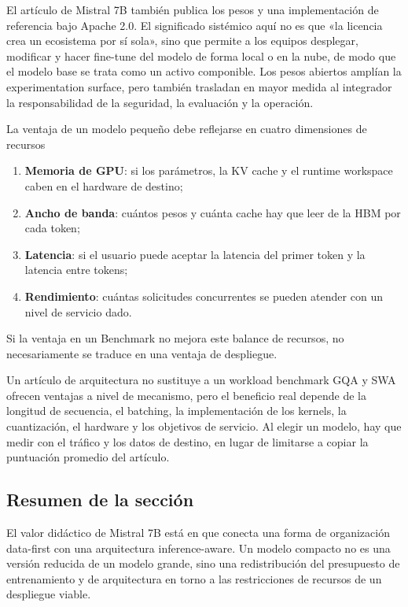 \documentclass[a4paper]{article}
\begin{document}
El artículo de Mistral 7B también publica los pesos y una implementación de referencia bajo Apache 2.0. El significado sistémico aquí no es que «la licencia crea un ecosistema por sí sola», sino que permite a los equipos desplegar, modificar y hacer fine-tune del modelo de forma local o en la nube, de modo que el modelo base se trata como un activo componible. Los pesos abiertos amplían la experimentation surface, pero también trasladan en mayor medida al integrador la responsabilidad de la seguridad, la evaluación y la operación.

\begin{importantbox}{La ventaja de un modelo pequeño debe reflejarse en cuatro dimensiones de recursos}
\begin{enumerate}
  \item \textbf{Memoria de GPU}: si los parámetros, la KV cache y el runtime workspace caben en el hardware de destino;
  \item \textbf{Ancho de banda}: cuántos pesos y cuánta cache hay que leer de la HBM por cada token;
  \item \textbf{Latencia}: si el usuario puede aceptar la latencia del primer token y la latencia entre tokens;
  \item \textbf{Rendimiento}: cuántas solicitudes concurrentes se pueden atender con un nivel de servicio dado.
\end{enumerate}
Si la ventaja en un Benchmark no mejora este balance de recursos, no necesariamente se traduce en una ventaja de despliegue.
\end{importantbox}

\begin{warningbox}{Un artículo de arquitectura no sustituye a un workload benchmark}
GQA y SWA ofrecen ventajas a nivel de mecanismo, pero el beneficio real depende de la longitud de secuencia, el batching, la implementación de los kernels, la cuantización, el hardware y los objetivos de servicio. Al elegir un modelo, hay que medir con el tráfico y los datos de destino, en lugar de limitarse a copiar la puntuación promedio del artículo.
\end{warningbox}

\subsection{Resumen de la sección}

El valor didáctico de Mistral 7B está en que conecta una forma de organización data-first con una arquitectura inference-aware. Un modelo compacto no es una versión reducida de un modelo grande, sino una redistribución del presupuesto de entrenamiento y de arquitectura en torno a las restricciones de recursos de un despliegue viable.
\end{document}
